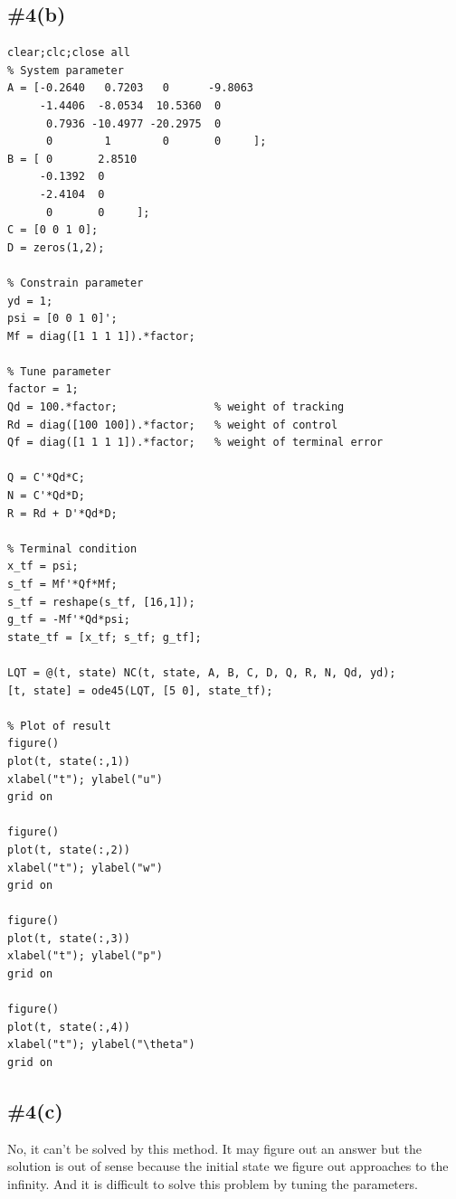 \documentclass[12pt]{article}
\begin{document}

\MakeTitlePage{}


\subsection*{\#4(b)}

\begin{verbatim}
clear;clc;close all
% System parameter
A = [-0.2640   0.7203   0      -9.8063
     -1.4406  -8.0534  10.5360  0
      0.7936 -10.4977 -20.2975  0
      0        1        0       0     ];
B = [ 0       2.8510
     -0.1392  0
     -2.4104  0
      0       0     ];
C = [0 0 1 0];
D = zeros(1,2);

% Constrain parameter
yd = 1;
psi = [0 0 1 0]';
Mf = diag([1 1 1 1]).*factor;

% Tune parameter
factor = 1;
Qd = 100.*factor;               % weight of tracking
Rd = diag([100 100]).*factor;   % weight of control
Qf = diag([1 1 1 1]).*factor;   % weight of terminal error

Q = C'*Qd*C;
N = C'*Qd*D;
R = Rd + D'*Qd*D;

% Terminal condition
x_tf = psi;
s_tf = Mf'*Qf*Mf;
s_tf = reshape(s_tf, [16,1]);
g_tf = -Mf'*Qd*psi;
state_tf = [x_tf; s_tf; g_tf];

LQT = @(t, state) NC(t, state, A, B, C, D, Q, R, N, Qd, yd);
[t, state] = ode45(LQT, [5 0], state_tf);

% Plot of result
figure()
plot(t, state(:,1))
xlabel("t"); ylabel("u")
grid on

figure()
plot(t, state(:,2))
xlabel("t"); ylabel("w")
grid on

figure()
plot(t, state(:,3))
xlabel("t"); ylabel("p")
grid on

figure()
plot(t, state(:,4))
xlabel("t"); ylabel("\theta")
grid on
\end{verbatim}

\subsection*{\#4(c)}
\large
No, it can't be solved by this method. It may figure out an answer but the solution is out of sense because the initial state we figure out approaches to the infinity. And it is difficult to solve this problem by tuning the parameters.
\end{document}
